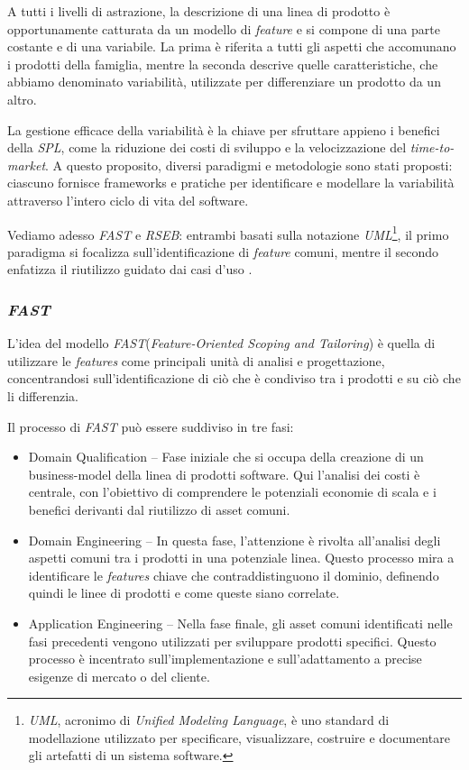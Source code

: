 \documentclass[12pt]{report}
\newcommand{\spl}{\textsl{SPL}\xspace}
\newcommand{\fast}{\textsl{FAST}\xspace}
\newcommand{\rseb}{\textsl{RSEB}\xspace}
\newcommand{\uml}{\textsl{UML}\xspace}
\begin{document}
A tutti i livelli di astrazione, la descrizione di una linea di prodotto è opportunamente catturata da un modello di \textit{feature} e si compone di una parte costante e di una variabile. La prima è riferita a tutti gli aspetti che accomunano i prodotti della famiglia, mentre la seconda descrive quelle caratteristiche, che abbiamo denominato variabilità, utilizzate per differenziare un prodotto da un altro.

La gestione efficace della variabilità è la chiave per sfruttare appieno i benefici della \spl, come la riduzione dei costi di sviluppo e la velocizzazione del \textit{time-to-market}. A questo proposito, diversi paradigmi e metodologie sono stati proposti: ciascuno fornisce frameworks e pratiche per identificare e modellare la variabilità attraverso l'intero ciclo di vita del software.

Vediamo adesso \fast e \rseb: entrambi basati sulla notazione \uml\footnote{\uml, acronimo di \textit{Unified Modeling Language}, è uno standard di modellazione utilizzato per specificare, visualizzare, costruire e documentare gli artefatti di un sistema software.}, il primo paradigma si focalizza sull'identificazione di \textit{feature} comuni, mentre il secondo enfatizza il riutilizzo guidato dai casi d'uso \cite{griss:favaro:alessandro, harsu}.


\subsubsection{\fast}
L'idea del modello \fast (\textit{Feature-Oriented Scoping and Tailoring}) \cite{harsu} è quella di utilizzare le \textit{features} come principali unità di analisi e progettazione, concentrandosi sull'identificazione di ciò che è condiviso tra i prodotti e su ciò che li differenzia.

Il processo di \fast può essere suddiviso in tre fasi:

\begin{itemize}
\item \textsf{Domain Qualification} -- Fase iniziale che si occupa della creazione di un business-model della linea di prodotti software. Qui l'analisi dei costi è centrale, con l'obiettivo di comprendere le potenziali economie di scala e i benefici derivanti dal riutilizzo di asset comuni.
\item \textsf{Domain Engineering} -- In questa fase, l'attenzione è rivolta all'analisi degli aspetti comuni tra i prodotti in una potenziale linea. Questo processo mira a identificare le \textit{features} chiave che contraddistinguono il dominio, definendo quindi le linee di prodotti e come queste siano correlate.
\item \textsf{Application Engineering} -- Nella fase finale, gli asset comuni identificati nelle fasi precedenti vengono utilizzati per sviluppare prodotti specifici. Questo processo è incentrato sull'implementazione e sull'adattamento a precise esigenze di mercato o del cliente.
\end{itemize}
\end{document}
